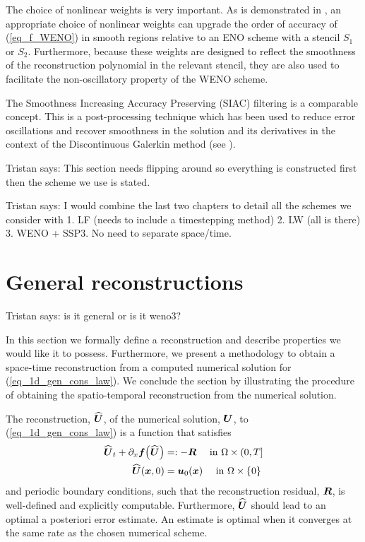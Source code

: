 \documentclass[final]{amsart}
\newcommand{\recgs}[1]{\widehat{\vec{#1}}}
\renewcommand{\vect}[1]{\geovec{#1}}
\renewcommand{\vec}[1]{\geovec{#1}}
\newcommand{\tristan}[1]{{\color{purple} Tristan says:  #1 }}
\numberwithin{equation}{section}
\begin{document}
\begin{Rem}
  The choice of nonlinear weights is very important.  As is
  demonstrated in \cite{jiang1996efficient}, an appropriate choice of
  nonlinear weights can upgrade the order of accuracy of
  (\ref{eq_f_WENO}) in smooth regions relative to an ENO scheme with a
  stencil $S_1$ or $S_2$.  Furthermore, because these weights are
  designed to reflect the smoothness of the reconstruction polynomial
  in the relevant stencil, they are also used to facilitate the
  non-oscillatory property of the WENO scheme.
	
  The Smoothness Increasing Accuracy Preserving (SIAC) filtering is a
  comparable concept.  This is a post-processing technique which has
  been used to reduce error oscillations and recover smoothness in the
  solution and its derivatives in the context of the Discontinuous
  Galerkin method (see \cite{dedner2019residual}).
\end{Rem}

\tristan{This section needs flipping around so everything is
  constructed first then the scheme we use is stated.}

\tristan{I would combine the last two chapters to detail all the
  schemes we consider with 1. LF (needs to include a timestepping
  method) 2. LW (all is there) 3. WENO + SSP3. No need to separate
  space/time.}

\section{General reconstructions}
\tristan{is it general or is it weno3?}
\label{sec:general_reconstructions}

In this section we formally define a reconstruction and describe
properties we would like it to possess.  Furthermore, we present a
methodology to obtain a space-time reconstruction from a computed
numerical solution for (\ref{eq_1d_gen_cons_law}).  We conclude the
section by illustrating the procedure of obtaining the spatio-temporal
reconstruction from the numerical solution.

\begin{Defn}[Reconstruction]\label{defn_reconstruction}
The reconstruction, $\recgs{U}$, of the numerical solution, $\vec{U}$,
to (\ref{eq_1d_gen_cons_law}) is a function that satisfies
\begin{equation}
\label{eq:ibvpU}
\begin{aligned}
\widehat{\vect{U}}_t+\partial_x\vect{f\qp{\widehat{\vect{U}}}}
&=:-\vect{R}\quad \text{ in }\W \times (0,T]
\\
\widehat{\vect{U}}(\vect x,0) &= \vect{u}_0(\vect x) \quad \text{ in } \W \times \{0\}
\end{aligned}
\end{equation}
and periodic boundary conditions, such that the reconstruction
residual, $\vect{R}$, is well-defined and explicitly computable.
Furthermore, $\widehat{\vect{U}}$ should lead to an optimal a
posteriori error estimate.  An estimate is optimal when it converges
at the same rate as the chosen numerical scheme.
\end{Defn}
\end{document}

